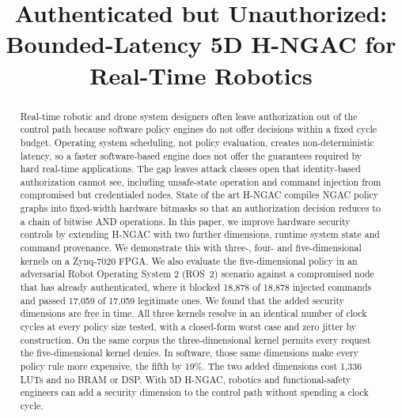 \documentclass[conference]{IEEEtran}
\begin{document}
\title{Authenticated but Unauthorized: Bounded-Latency 5D H-NGAC for Real-Time Robotics}


\author{
}

\maketitle

\begin{abstract}
Real-time robotic and drone system designers often leave authorization out of the control path because software policy engines do not offer decisions within a fixed cycle budget. Operating system scheduling, not policy evaluation, creates non-deterministic latency, so a faster software-based engine does not offer the guarantees required by hard real-time applications. The gap leaves attack classes open that identity-based authorization cannot see, including unsafe-state operation and command injection from compromised but credentialed nodes. State of the art H-NGAC compiles NGAC policy graphs into fixed-width hardware bitmasks so that an authorization decision reduces to a chain of bitwise AND operations. In this paper, we improve hardware security controls by extending H-NGAC with two further dimensions, runtime system state and command provenance. We demonstrate this with three-, four- and five-dimensional kernels on a Zynq-7020 FPGA. %
We also evaluate the five-dimensional policy in an adversarial Robot Operating System 2 (ROS~2) scenario against a compromised node that has already authenticated, where it blocked 18{,}878 of 18{,}878 injected commands and passed 17{,}059 of 17{,}059 legitimate ones. We found that the added security dimensions are free in time. All three kernels resolve in an identical number of clock cycles at every policy size tested, with a closed-form worst case and zero jitter by construction.
On the same corpus the three-dimensional kernel permits every request the five-dimensional kernel denies.
In software, those same dimensions make every policy rule more expensive, the fifth by 19\%. The two added dimensions cost 1{,}336 LUTs and no BRAM or DSP. With 5D H-NGAC, robotics and functional-safety engineers can add a security dimension to the control path without spending a clock cycle.
\end{abstract}
\end{document}
